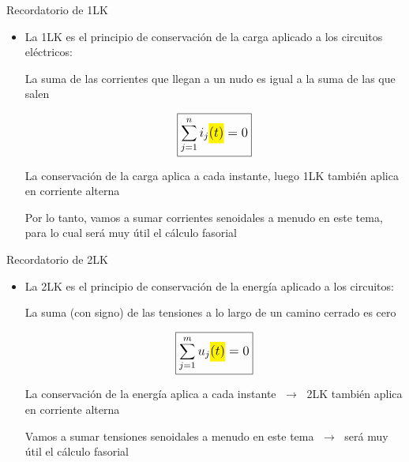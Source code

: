 \documentclass[aspectratio=169, usenames,svgnames,dvipsnames]{beamer}
\begin{document}
\begin{frame}{Recordatorio de 1LK}
    \begin{itemize}
        \item La \alert{1LK} es el principio de \alert{conservación de la carga} aplicado a los circuitos eléctricos:
        
        \vspace{5mm}
        
        La suma de las corrientes que llegan a un nudo es igual a la suma de las que salen   

        \vspace{2mm}
        \begin{equation*}
            \large{\boxed{ \sum_{j=1}^n i_j\colorbox{yellow}{\hspace{-1mm}$(t)$\hspace{-1mm}} = 0}}
        \end{equation*}

        \vspace{2mm}
        La conservación de la carga \alert{aplica a cada instante}, luego 1LK también \alert{aplica en corriente alterna}

        \vspace{5mm}
        Por lo tanto, vamos a sumar corrientes senoidales a menudo en este tema, para lo cual será muy útil el \alert{cálculo fasorial}
        
    \end{itemize}    
\end{frame}


\begin{frame}{Recordatorio de 2LK}
    \begin{itemize}
        \item La \alert{2LK} es el principio de \alert{conservación de la energía} aplicado a los circuitos:
        
        \vspace{5mm}
        
        La suma (con signo) de las tensiones a lo largo de un camino cerrado es cero        

        \vspace{2mm}
        \begin{equation*}
            \large{\boxed{\sum_{j=1}^m u_j\colorbox{yellow}{\hspace{-1mm}$(t)$\hspace{-1mm}} = 0}}
        \end{equation*}

        \vspace{2mm}
        La conservación de la energía \alert{aplica a cada instante} $\; \rightarrow \;$ 2LK también \alert{aplica en corriente alterna}

        \vspace{5mm}
        Vamos a sumar tensiones senoidales a menudo en este tema $\; \rightarrow \;$ será muy útil el \alert{cálculo fasorial}
    \end{itemize}    
\end{frame}
\end{document}

